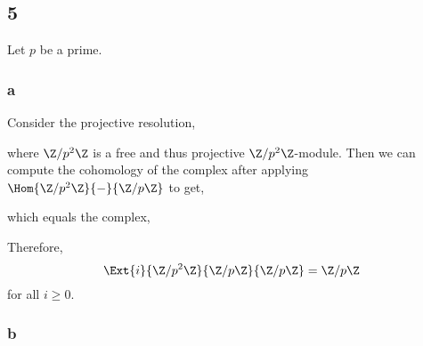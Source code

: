 \documentclass[12pt]{article}
\begin{document}
\subsection{5}

Let $p$ be a prime.

\subsubsection{a}

Consider the projective resolution,
\begin{center}
\end{center}
where $\Z / p^2 \Z$ is a free and thus projective $\Z / p^2 \Z$-module. Then we can compute the cohomology of the complex after applying $\Hom{\Z/p^2\Z}{-}{\Z/p\Z}$ to get,
\begin{center}
\end{center}
which equals the complex,
\begin{center}
\end{center}
Therefore, 
\[ \Ext{i}{\Z / p^2 \Z}{\Z / p\Z}{\Z / p\Z} = \Z / p \Z \] 
for all $i \ge 0$.

\subsubsection{b}
\end{document}
